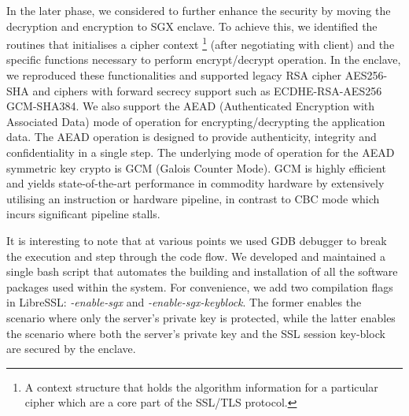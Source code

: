 \documentclass[../main.tex]{subfiles}
\begin{document}
In the later phase, we considered to further enhance the security by
moving the decryption and encryption to SGX enclave. To achieve this,
we identified the routines that initialises a cipher context
\footnote{A context structure that holds the algorithm information for
  a particular cipher which are a core part of the SSL/TLS protocol.}
(after negotiating with client) and the specific functions necessary
to perform encrypt/decrypt operation. In the enclave, we reproduced
these functionalities and supported legacy RSA cipher AES256-SHA and
ciphers with forward secrecy support such as ECDHE-RSA-AES256
GCM-SHA384. We also support the AEAD (Authenticated Encryption with
Associated Data) mode of operation for encrypting/decrypting the
application data. The AEAD operation is designed to provide
authenticity, integrity and confidentiality in a single step. The
underlying mode of operation for the AEAD symmetric key crypto is GCM
(Galois Counter Mode). GCM is highly efficient and yields
state-of-the-art performance in commodity hardware by extensively
utilising an instruction or hardware pipeline, in contrast to CBC mode
which incurs significant pipeline stalls.

It is interesting to note that at various points we used GDB debugger
to break the execution and step through the code flow. We developed
and maintained a single bash script that automates the building and
installation of all the software packages used within the system. For
convenience, we add two compilation flags in LibreSSL:
\textit{-enable-sgx} and \textit{-enable-sgx-keyblock}. The former
enables the scenario where only the server's private key is protected,
while the latter enables the scenario where both the server's private
key and the SSL session key-block are secured by the enclave.
\end{document}
